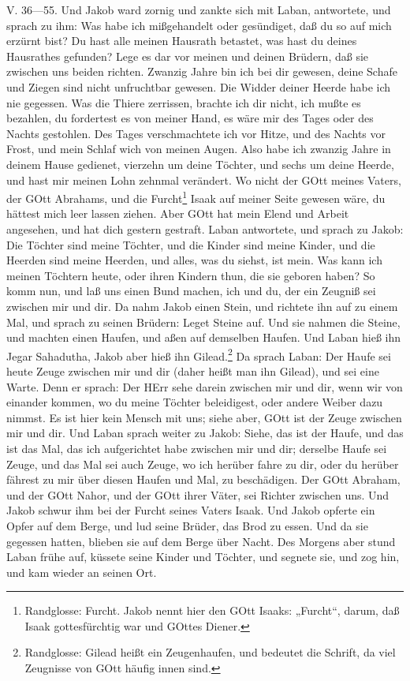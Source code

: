 \begin{schriftzitat}
V. 36—55. Und Jakob ward zornig und zankte sich mit Laban, antwortete, und sprach zu ihm: Was habe ich mißgehandelt oder gesündiget, daß du so auf mich erzürnt bist? Du hast alle meinen Hausrath betastet, was hast du deines Hausrathes gefunden? Lege es dar vor meinen und deinen Brüdern, daß sie zwischen uns beiden richten. Zwanzig Jahre bin ich bei dir gewesen, deine Schafe und Ziegen sind nicht unfruchtbar gewesen. Die Widder deiner Heerde habe ich nie gegessen. Was die Thiere zerrissen, brachte ich dir nicht, ich mußte es bezahlen, du fordertest es von meiner Hand, es wäre mir des Tages oder des Nachts gestohlen. Des Tages verschmachtete ich vor Hitze, und des Nachts vor Frost, und mein Schlaf wich von meinen Augen. Also habe ich zwanzig Jahre in deinem Hause gedienet, vierzehn um deine Töchter, und sechs um deine Heerde, und hast mir meinen Lohn zehnmal verändert. Wo nicht der GOtt meines Vaters, der GOtt Abrahams, und die Furcht\footnote{Randglosse: Furcht. Jakob nennt hier den GOtt Isaaks: „Furcht“, darum, daß Isaak gottesfürchtig war und GOttes Diener.} Isaak auf meiner Seite gewesen wäre, du hättest mich leer lassen ziehen. Aber GOtt hat mein Elend und Arbeit angesehen, und hat dich gestern gestraft. Laban antwortete, und sprach zu Jakob: Die Töchter sind meine Töchter, und die Kinder sind meine Kinder, und die Heerden sind meine Heerden, und alles, was du siehst, ist mein. Was kann ich meinen Töchtern heute, oder ihren Kindern thun, die sie geboren haben? So komm nun, und laß uns einen Bund machen, ich und du, der ein Zeugniß sei zwischen mir und dir. Da nahm Jakob einen Stein, und richtete ihn auf zu einem Mal, und sprach zu seinen Brüdern: Leget Steine auf. Und sie nahmen die Steine, und machten einen Haufen, und aßen auf demselben Haufen. Und Laban hieß ihn Jegar Sahadutha, Jakob aber hieß ihn Gilead.\footnote{Randglosse: Gilead heißt ein Zeugenhaufen, und bedeutet die Schrift, da viel Zeugnisse von GOtt häufig innen sind.} Da sprach Laban: Der Haufe sei heute Zeuge zwischen mir und dir (daher heißt man ihn Gilead), und sei eine Warte. Denn er sprach: Der HErr sehe darein zwischen mir und dir, wenn wir von einander kommen, wo du meine Töchter beleidigest, oder andere Weiber dazu nimmst. Es ist hier kein Mensch mit uns; siehe aber, GOtt ist der Zeuge zwischen mir und dir. Und Laban sprach weiter zu Jakob: Siehe, das ist der Haufe, und das ist das Mal, das ich aufgerichtet habe zwischen mir und dir; derselbe Haufe sei Zeuge, und das Mal sei auch Zeuge, wo ich herüber fahre zu dir, oder du herüber fährest zu mir über diesen Haufen und Mal, zu beschädigen. Der GOtt Abraham, und der GOtt Nahor, und der GOtt ihrer Väter, sei Richter zwischen uns. Und Jakob schwur ihm bei der Furcht seines Vaters Isaak. Und Jakob opferte ein Opfer auf dem Berge, und lud seine Brüder, das Brod zu essen. Und da sie gegessen hatten, blieben sie auf dem Berge über Nacht. Des Morgens aber stund Laban frühe auf, küssete seine Kinder und Töchter, und segnete sie, und zog hin, und kam wieder an seinen Ort.


\end{schriftzitat}
